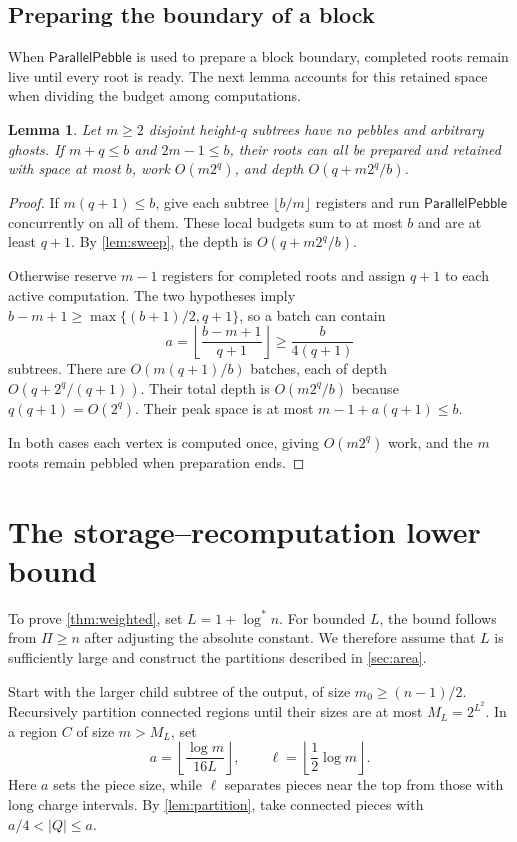 \documentclass[11pt]{article}
\newtheorem{lemma}[lemma]{Lemma}
\theoremstyle{definition}
\theoremstyle{remark}
\newcommand{\Sweep}{\mathsf{ParallelPebble}}
\begin{document}
\subsection{Preparing the boundary of a block}

When $\Sweep$ is used to prepare a block boundary, completed roots remain live until every root is ready. The next lemma accounts for this retained space when dividing the budget among computations.

\begin{lemma}
\label{lem:frontier}
Let $m\ge2$ disjoint height-$q$ subtrees have no pebbles and arbitrary ghosts. If $m+q\le b$ and $2m-1\le b$, their roots can all be prepared and retained with space at most $b$, work $O(m2^q)$, and depth $O(q+m2^q/b)$.
\end{lemma}
\begin{proof}
If $m(q+1)\le b$, give each subtree $\lfloor b/m\rfloor$ registers and run $\Sweep$ concurrently on all of them. These local budgets sum to at most $b$ and are at least $q+1$. By \cref{lem:sweep}, the depth is $O(q+m2^q/b)$.

Otherwise reserve $m-1$ registers for completed roots and assign $q+1$ to each active computation. The two hypotheses imply
$b-m+1\ge\max\{(b+1)/2,q+1\}$, so a batch can contain
\[
a=\left\lfloor\frac{b-m+1}{q+1}\right\rfloor\ge\frac{b}{4(q+1)}
\]
subtrees. There are $O(m(q+1)/b)$ batches, each of depth $O(q+2^q/(q+1))$. Their total depth is $O(m2^q/b)$ because $q(q+1)=O(2^q)$. Their peak space is at most $m-1+a(q+1)\le b$.

In both cases each vertex is computed once, giving $O(m2^q)$ work, and the $m$ roots remain pebbled when preparation ends.
\end{proof}

\section{The storage--recomputation lower bound}
\label{app:storage}

To prove \cref{thm:weighted}, set $L=1+\log^*n$. For bounded $L$, the bound follows from $\Pi\ge n$ after adjusting the absolute constant. We therefore assume that $L$ is sufficiently large and construct the partitions described in \cref{sec:area}.

Start with the larger child subtree of the output, of size $m_0\ge(n-1)/2$. Recursively partition connected regions until their sizes are at most $M_L=2^{L^2}$. In a region $C$ of size $m>M_L$, set
\[
a=\left\lfloor\frac{\log m}{16L}\right\rfloor, \qquad \ell=\left\lfloor\frac12\log m\right\rfloor.
\]
Here $a$ sets the piece size, while $\ell$ separates pieces near the top from those with long charge intervals. By \cref{lem:partition}, take connected pieces with $a/4<|Q|\le a$.
\end{document}
